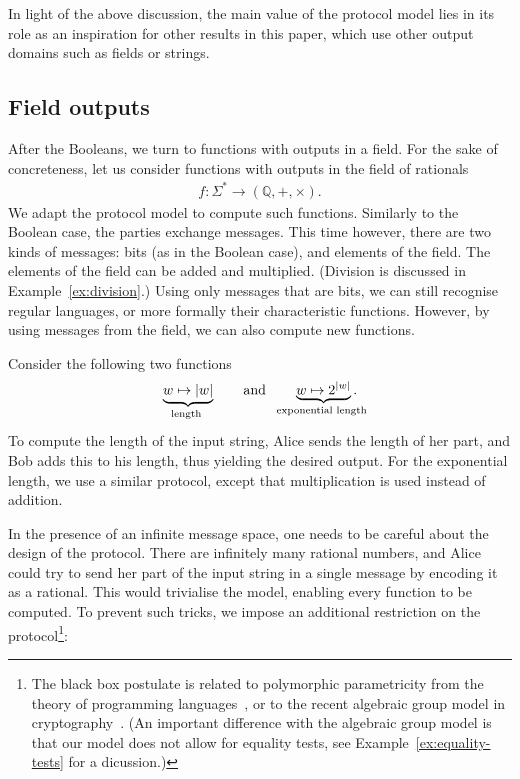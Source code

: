 In light of the above discussion,
the  main value of the protocol model lies in its role as an inspiration for other results in this paper, which use  other output domains  such as  fields or strings. 


\subsection{Field outputs}
\label{sec:intro-field}



After the Booleans, we turn to functions with outputs in a field. For the sake of concreteness, let us  consider functions with outputs in the  field of rationals
\begin{align*}
f : \Sigma^* \to (\mathbb Q, +, \times).
\end{align*}
We adapt the  protocol model to  compute such functions. Similarly to the Boolean case, the parties exchange messages. This time however, there are two kinds of messages: bits (as in the Boolean case), and  elements of the field.  The elements of the field can be added and multiplied.  (Division is discussed in Example~\ref{ex:division}.)  Using only messages that are bits, we can still recognise regular languages, or more formally their characteristic functions. 
However, by using messages from the field, we can also compute new functions.

\begin{myexample}\label{ex:length}
    Consider the following two functions
\begin{align*}
\myunderbrace{w \mapsto |w|}{length} \qquad \text{and} \qquad \myunderbrace{w \mapsto 2^{|w|}}{exponential length}.
\end{align*}
To compute the length of the input string, Alice  sends the length of her part, and Bob adds this to his length, thus yielding the desired output. For the exponential length, we use a similar protocol, except that multiplication is used instead of addition. 
\end{myexample}


In the presence of an infinite message space, one needs to be careful about the design of the protocol. There are infinitely many rational numbers, and Alice could try to send her part of the input string in a single message by encoding it as a rational. This would trivialise the model, enabling every function to be computed. To prevent such tricks, we impose an additional restriction on the protocol\footnote{The black box postulate is related to  polymorphic parametricity from the theory of programming languages~\cite[Section 7]{reynolds1983types}, or to the recent algebraic group model in cryptography~\cite[Section 1.2]{fuchsbauer2018algebraic}. (An important difference with the algebraic group model is that our model does not allow for equality tests, see Example~\ref{ex:equality-tests} for a dicussion.)}:

